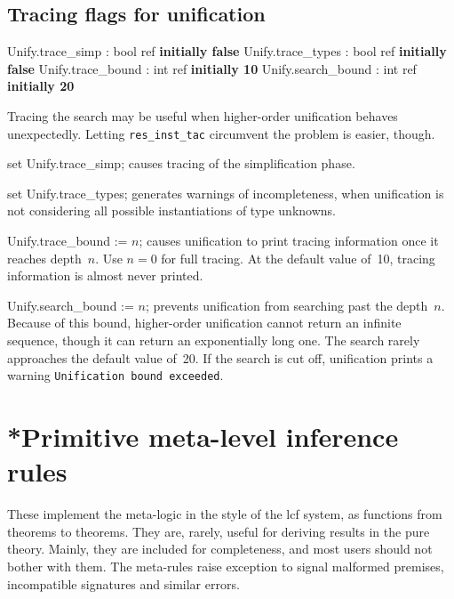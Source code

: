 \subsection{Tracing flags for unification}
\begin{ttbox} 
Unify.trace_simp   : bool ref \hfill\textbf{initially false}
Unify.trace_types  : bool ref \hfill\textbf{initially false}
Unify.trace_bound  : int ref \hfill\textbf{initially 10}
Unify.search_bound : int ref \hfill\textbf{initially 20}
\end{ttbox}
Tracing the search may be useful when higher-order unification behaves
unexpectedly.  Letting {\tt res_inst_tac} circumvent the problem is easier,
though.
\begin{ttdescription}
\item[set Unify.trace_simp;] 
causes tracing of the simplification phase.

\item[set Unify.trace_types;] 
generates warnings of incompleteness, when unification is not considering
all possible instantiations of type unknowns.

\item[Unify.trace_bound := $n$;] 
causes unification to print tracing information once it reaches depth~$n$.
Use $n=0$ for full tracing.  At the default value of~10, tracing
information is almost never printed.

\item[Unify.search_bound := $n$;] prevents unification from
  searching past the depth~$n$.  Because of this bound, higher-order
  unification cannot return an infinite sequence, though it can return
  an exponentially long one.  The search rarely approaches the default value
  of~20.  If the search is cut off, unification prints a warning
  \texttt{Unification bound exceeded}.
\end{ttdescription}


\section{*Primitive meta-level inference rules}
These implement the meta-logic in the style of the {\sc lcf} system,
as functions from theorems to theorems.  They are, rarely, useful for
deriving results in the pure theory.  Mainly, they are included for
completeness, and most users should not bother with them.  The
meta-rules raise exception  to signal malformed premises,
incompatible signatures and similar errors.

